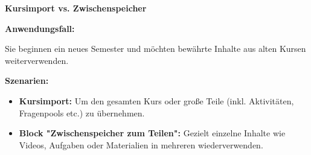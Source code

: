 \documentclass{article}
\newlength{\commonwidth}
\begin{document}
\begin{center}
\textbf{\textcolor{customred}{\LARGE Kursimport \faFileImport{} vs. Zwischenspeicher \faShoppingCart}}
\end{center}

\vspace{0.5cm}

\begin{center}
\begin{minipage}{\commonwidth}
\begin{mdframed}[backgroundcolor=lightgray, linewidth=0pt, roundcorner=5pt]
\textbf{Anwendungsfall:}

Sie beginnen ein neues Semester und möchten bewährte Inhalte aus alten Kursen weiterverwenden.

\vspace{0.3cm}

\textbf{Szenarien:}
\begin{itemize}
  \item \textbf{Kursimport:} Um den gesamten Kurs oder große Teile (inkl. Aktivitäten, Fragenpools etc.) zu übernehmen.
  \item \textbf{Block "Zwischenspeicher zum Teilen":} Gezielt einzelne Inhalte wie Videos, Aufgaben oder Materialien in mehreren wiederverwenden.
\end{itemize}
\end{mdframed}
\end{minipage}
\end{center}

\vspace{0.8cm}

\renewcommand{\arraystretch}{1.4}  %
\setlength{\tabcolsep}{8pt}        %
\end{document}
